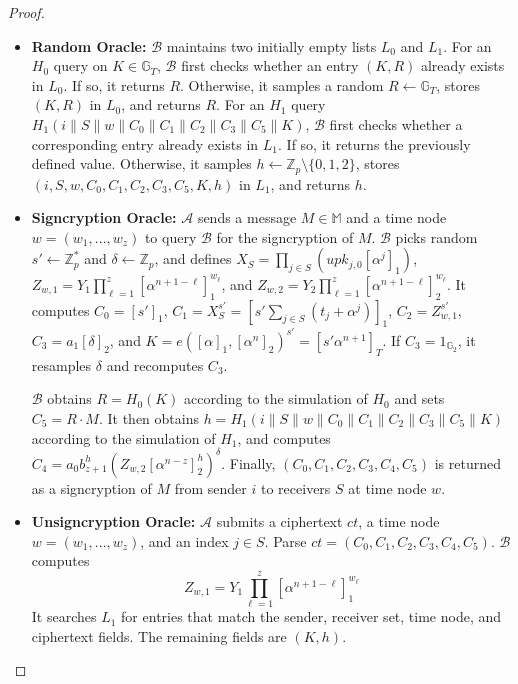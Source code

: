 \documentclass[sigconf,anonymous]{acmart}
\theoremstyle{definition}
\theoremstyle{definition}
\theoremstyle{definition}
\theoremstyle{definition}
\theoremstyle{definition}
\theoremstyle{definition}
\theoremstyle{definition}
\theoremstyle{definition}
\theoremstyle{definition}
\begin{document}
\begin{proof}
	\begin{itemize}
		
		\item \textbf{Random Oracle:}
		$\mathcal{B}$ maintains two initially empty lists $L_0$ and $L_1$.
		For an $H_0$ query on $K\in\mathbb{G}_T$, $\mathcal{B}$ first checks
		whether an entry $(K,R)$ already exists in $L_0$. If so, it returns
		$R$. Otherwise, it samples a random $R\leftarrow\mathbb{G}_T$,
		stores $(K,R)$ in $L_0$, and returns $R$.
		For an $H_1$ query
		$H_1(i\parallel S\parallel w\parallel C_0\parallel C_1\parallel
		C_2\parallel C_3\parallel C_5\parallel K)$,
		$\mathcal{B}$ first checks whether a corresponding entry already
		exists in $L_1$. If so, it returns the previously defined value.
		Otherwise, it samples
		$h\leftarrow\mathbb{Z}_p\setminus\{0,1,2\}$,
		stores
		$(i,S,w,C_0,C_1,C_2,C_3,C_5,K,h)$ in $L_1$,
		and returns $h$.
		
		\item \textbf{Signcryption Oracle:}
		$\mathcal{A}$ sends a message $M\in\mathbb{M}$ and a time node
		$w=(w_1,\ldots,w_z)$ to query $\mathcal{B}$ for the signcryption of
		$M$.
		$\mathcal{B}$ picks random
		$s'\leftarrow\mathbb{Z}_p^{*}$ and
		$\delta\leftarrow\mathbb{Z}_p$, and defines
		$X_S=\prod_{j\in S}(upk_{j,0}[\alpha^j]_1)$,
		$Z_{w,1}=Y_1\prod_{\ell=1}^{z}
		[\alpha^{n+1-\ell}]_1^{w_\ell}$, and
		$Z_{w,2}=Y_2\prod_{\ell=1}^{z}
		[\alpha^{n+1-\ell}]_2^{w_\ell}$.
		It computes
		$C_0=[s']_1$,
		$C_1=X_S^{s'}=
		[s'\sum_{j\in S}(t_j+\alpha^j)]_1$,
		$C_2=Z_{w,1}^{s'}$,
		$C_3=a_1[\delta]_2$, and
		$K=e([\alpha]_1,[\alpha^n]_2)^{s'}
		=[s'\alpha^{n+1}]_T$.
		If $C_3=1_{\mathbb{G}_2}$, it resamples $\delta$ and recomputes $C_3$.
		
		$\mathcal{B}$ obtains $R=H_0(K)$ according to the simulation of
		$H_0$ and sets $C_5=R\cdot M$.
		It then obtains
		$h=H_1(i\parallel S\parallel w\parallel C_0\parallel C_1\parallel
		C_2\parallel C_3\parallel C_5\parallel K)$
		according to the simulation of $H_1$, and computes
		$C_4=a_0b_{z+1}^{h}
		(Z_{w,2}[\alpha^{n-z}]_2^{h})^{\delta}$.
		Finally,
		$(C_0,C_1,C_2,C_3,C_4,C_5)$
		is returned as a signcryption of $M$ from sender $i$ to receivers
		$S$ at time node $w$.
		
		\item \textbf{Unsigncryption Oracle:}
		$\mathcal{A}$ submits a ciphertext $ct$, a time node
		$w=(w_1,\ldots,w_z)$, and an index $j\in S$.
		Parse $ct=(C_0,C_1,C_2,C_3,C_4,C_5)$.
		$\mathcal{B}$ computes
		\[
		Z_{w,1}=Y_1\prod_{\ell=1}^{z}
		[\alpha^{n+1-\ell}]_1^{w_\ell}
		\]
		It searches $L_1$ for entries that match the sender, receiver set,
		time node, and ciphertext fields. The remaining fields are $(K,h)$.
		

\end{itemize}
\end{proof}
\end{document}
